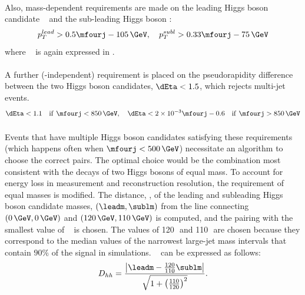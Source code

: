 \paragraph{}
Also, mass-dependent requirements are made on the leading Higgs boson candidate \pt~ and the sub-leading Higgs boson \pt:
\begin{equation}
p_T^{lead} > 0.5\mfourj - 105\,\GeV, \quad
p_T^{subl} > 0.33\mfourj - 75\,\GeV
\end{equation}
where \mfourj~ is again expressed in \GeV.

\paragraph{}
A further (\mfourj-independent) requirement is placed on the pseudorapidity difference between the two Higgs boson candidates, $\dEta < 1.5$, which rejects multi-jet events.
\begin{equation}
\dEta < 1.1 \quad \mathrm{if}\ \mfourj < 850\,\GeV , \quad
\dEta < 2\times10^{-3} \mfourj - 0.6 \quad \mathrm{if}\ \mfourj > 850\,\GeV
\end{equation}

\paragraph{}
Events that have multiple Higgs boson candidates satisfying these requirements (which happens often when $\mfourj < 500\,\GeV$) necessitate an algorithm to choose the correct pairs. 
The optimal choice would be the combination most consistent with the decays of two Higgs bosons of equal mass.
To account for energy loss in measurement and reconstruction resolution, the requirement of equal masses is modified. 
The distance, \Dhh, of the leading and subleading Higgs boson candidate masses, $\left(\leadm, \sublm\right)$ from the line connecting $\left(0\,\GeV, 0\,\GeV\right)$ and $\left(120\,\GeV, 110\,\GeV\right)$ is computed, and the pairing with the smallest value of \Dhh~ is chosen.
The values of 120\,\GeV\, and 110\,\GeV\, are chosen because they correspond to the median values of the narrowest large-\R jet mass intervals that contain $90\%$ of the signal in simulations. %
\Dhh~ can be expressed as follows:
\begin{equation}
D_{hh} = \frac{\left|\leadm - \frac{120}{110}\sublm\right|}{\sqrt{1+\left(\frac{110}{120}\right)^{2}}}.
\end{equation}

